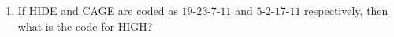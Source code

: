 \documentclass[journal]{IEEEtran}
\begin{document}
\begin{enumerate}[leftmargin=0pt]
\vspace{0.2cm}
\begin{enumerate}
\end{enumerate}
\hfill{}

\item
If HIDE and CAGE are coded as $19$-$23$-$7$-$11$ and $5$-$2$-$17$-$11$ respectively, then what is the code for HIGH?

\vspace{0.2cm}
\begin{enumerate}
\end{enumerate}
\hfill{}


\end{enumerate}
\end{document}
